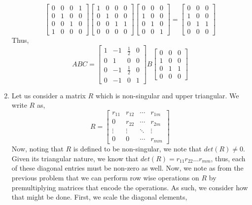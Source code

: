 \documentclass[letterpaper,10pt]{article}
\begin{document}
\begin{enumerate}
\[\begin{bmatrix}
0 & 0 & 0 & 1\\
0 & 1 & 0 & 0\\
0 & 0 & 1 & 0\\
1 & 0 & 0 & 0
\end{bmatrix} \begin{bmatrix}
1 & 0 & 0 & 0\\
0 & 1 & 0 & 0\\
0 & 0 & 1 & 1\\
0 & 0 & 0 & 0
\end{bmatrix}\begin{bmatrix}
0 & 0 & 0\\
1 & 0 & 0\\
0 & 1 & 0\\
0 & 0 & 1
\end{bmatrix}=\begin{bmatrix}
0 & 0 & 0\\
1 & 0 & 0\\
0 & 1 & 1\\
0 & 0 & 0
\end{bmatrix} \]
Thus,
\[ABC=\begin{bmatrix}
1 & -1 & \frac{1}{2} & 0\\
0 & 1 & 0 & 0\\
0 & -1 & \frac{1}{2} & 0\\
0 & -1 & 0 & 1
\end{bmatrix}B\begin{bmatrix}
0 & 0 & 0\\
1 & 0 & 0\\
0 & 1 & 1\\
0 & 0 & 0
\end{bmatrix} \]
\item Let us consider a matrix $R$ which is non-singular and upper triangular. We write $R$ as,
\[R=\begin{bmatrix}
r_{11} & r_{12} & \cdots & r_{1m}\\
0 & r_{22} & \cdots & r_{2m}\\
\vdots & \vdots & \ddots & \vdots\\
0 & 0 & \cdots & r_{mm}
\end{bmatrix} \]
Now, noting that $R$ is defined to be non-singular, we note that $det(R)\neq 0$. Given its triangular nature, we know that $det(R)=r_{11}r_{22}\ldots r_{mm}$, thus, each of these diagonal entries must be non-zero as well. Now, we note as from the previous problem that we can perform row wise operations on $R$ by premultiplying matrices that encode the operations. As such, we consider how that might be done. First, we scale the diagonal elements,

\end{enumerate}
\end{document}
